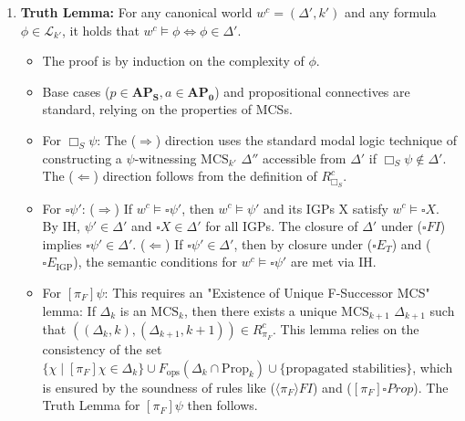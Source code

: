 \documentclass[
    12pt,              %
    a4paper,           %
    headings=normal,   %
    twoside=true,      %
    BCOR=8mm,          %
]{scrbook}
\newcommand{\BoxS}{\Box_S}
\newcommand{\BoxSyn}{\square}
\newcommand{\dynboxgen}[1]{[#1]}
\newcommand{\APS}{\mathbf{AP_S}}
\newcommand{\APZero}{\mathbf{AP_0}}
\newcommand{\Propk}[1]{\text{Prop}_{#1}}
\newcommand{\fops}{F_{\text{ops}}}
\newcommand{\MCS}{\text{MCS}}
\begin{document}
\begin{myproof}
\begin{enumerate}[label=\arabic*.]
\begin{itemize}
\begin{itemize}
                    \item   \( ((\Delta_1, k'), (\Delta_2, k' + 1)) \in R^c_{\pi_F} \iff \{\psi \mid \dynboxgen{\pi_F}\psi \in \Delta_1 \text{ and } \psi \in \mathcal{L}_{k'+1}\} \subseteq \Delta_2\), and additionally, \(\Delta_2\) must satisfy the generative consistency (\(\fops(\{\text{true level } k' \text{ props in } \Delta_1\}) \subseteq \Delta_2\)) and stability propagation conditions relative to \(\Delta_1\) (i.e., if \(\BoxSyn X_i \land X_i \in \Delta_1\) for IGPs \(X_i\) of \(\chi \in \fops(\dots)\), then \(\BoxSyn\chi \in \Delta_2\) if \(\chi \in \Delta_2\)). The existence of such unique successor \(\Delta_2\) is a critical lemma.
                \end{itemize}
            \item   \textbf{Valuation (\(V^c\)):} For any \(w^c = (\Delta', k')\) and any \(\chi \in \mathcal{L}_{k'}\), \(V^c(w^c, \chi) = \text{True} \iff \chi \in \Delta'\).
        \end{itemize}
    \item  \textbf{Truth Lemma:} For any canonical world \(w^c = (\Delta', k')\) and any formula \(\phi \in \mathcal{L}_{k'}\), it holds that \(w^c \vDash \phi \iff \phi \in \Delta'\).
        \begin{itemize}
            \item   The proof is by induction on the complexity of \(\phi\).
            \item   Base cases (\(p \in \APS, a \in \APZero\)) and propositional connectives are standard, relying on the properties of MCSs.
            \item   For \(\BoxS\psi\): The (\(\Rightarrow\)) direction uses the standard modal logic technique of constructing a \(\psi\)-witnessing \(\MCS_{k'}\) \(\Delta''\) accessible from \(\Delta'\) if \(\BoxS\psi \notin \Delta'\). The (\(\Leftarrow\)) direction follows from the definition of \(R^c_{\BoxS}\).
            \item   For \(\BoxSyn\psi'\): (\(\Rightarrow\)) If \(w^c \vDash \BoxSyn\psi'\), then \(w^c \vDash \psi'\) and its IGPs X satisfy \(w^c \vDash \BoxSyn X\). By IH, \(\psi' \in \Delta'\) and \(\BoxSyn X \in \Delta'\) for all IGPs. The closure of \(\Delta'\) under (\(\BoxSyn FI\)) implies \(\BoxSyn\psi' \in \Delta'\). (\(\Leftarrow\)) If \(\BoxSyn\psi' \in \Delta'\), then by closure under (\(\BoxSyn E_T\)) and (\(\BoxSyn E_{\text{IGP}}\)), the semantic conditions for \(w^c \vDash \BoxSyn\psi'\) are met via IH.
            \item   For \(\dynboxgen{\pi_F}\psi\): This requires an "Existence of Unique F-Successor MCS" lemma: If \(\Delta_k\) is an \(\MCS_k\), then there exists a unique \(\MCS_{k+1}\) \(\Delta_{k+1}\) such that \( ((\Delta_k, k), (\Delta_{k+1}, k + 1)) \in R^c_{\pi_F}\). This lemma relies on the consistency of the set \(\{\chi \mid \dynboxgen{\pi_F}\chi \in \Delta_k\} \cup \fops(\Delta_k \cap \Propk{k}) \cup \{\text{propagated stabilities}\}\), which is ensured by the soundness of rules like (\(\langle\pi_F\rangle FI\)) and (\(\dynboxgen{\pi_F}\BoxSyn Prop\)). The Truth Lemma for \(\dynboxgen{\pi_F}\psi\) then follows.

\end{itemize}
\end{enumerate}
\end{myproof}
\end{document}
